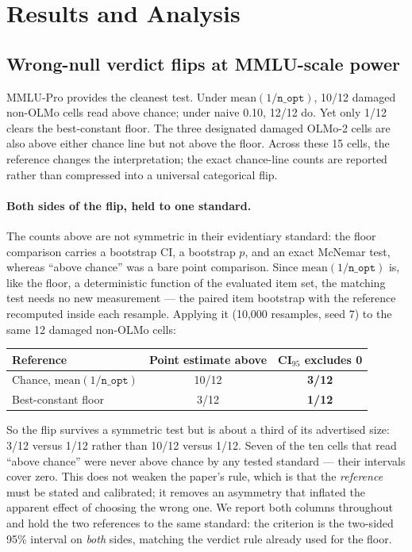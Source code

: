\section{Results and Analysis}

\subsection{Wrong-null verdict flips at MMLU-scale power}

MMLU-Pro provides the cleanest test. Under $\mathrm{mean}(1/\texttt{n\_opt})$, 10/12 damaged non-OLMo cells read above chance; under naive 0.10, 12/12 do. Yet only 1/12 clears the best-constant floor. The three designated damaged OLMo-2 cells are also above either chance line but not above the floor. Across these 15 cells, the reference changes the interpretation; the exact chance-line counts are reported rather than compressed into a universal categorical flip.

\paragraph{Both sides of the flip, held to one standard.}
The counts above are not symmetric in their evidentiary standard: the floor comparison carries a bootstrap CI, a bootstrap $p$, and an exact McNemar test, whereas ``above chance'' was a bare point comparison. Since $\mathrm{mean}(1/\texttt{n\_opt})$ is, like the floor, a deterministic function of the evaluated item set, the matching test needs no new measurement --- the paired item bootstrap with the reference recomputed inside each resample. Applying it (10{,}000 resamples, seed 7) to the same 12 damaged non-OLMo cells:

\begin{center}
\begin{tabular}{lcc}
\toprule
Reference & Point estimate above & CI$_{95}$ excludes 0 \\
\midrule
Chance, $\mathrm{mean}(1/\texttt{n\_opt})$ & 10/12 & \textbf{3/12} \\
Best-constant floor & 3/12 & \textbf{1/12} \\
\bottomrule
\end{tabular}
\end{center}

So the flip survives a symmetric test but is about a third of its advertised size: 3/12 versus 1/12 rather than 10/12 versus 1/12. Seven of the ten cells that read ``above chance'' were never above chance by any tested standard --- their intervals cover zero. This does not weaken the paper's rule, which is that the \emph{reference} must be stated and calibrated; it removes an asymmetry that inflated the apparent effect of choosing the wrong one. We report both columns throughout and hold the two references to the same standard: the criterion is the two-sided 95\% interval on \emph{both} sides, matching the verdict rule already used for the floor.

